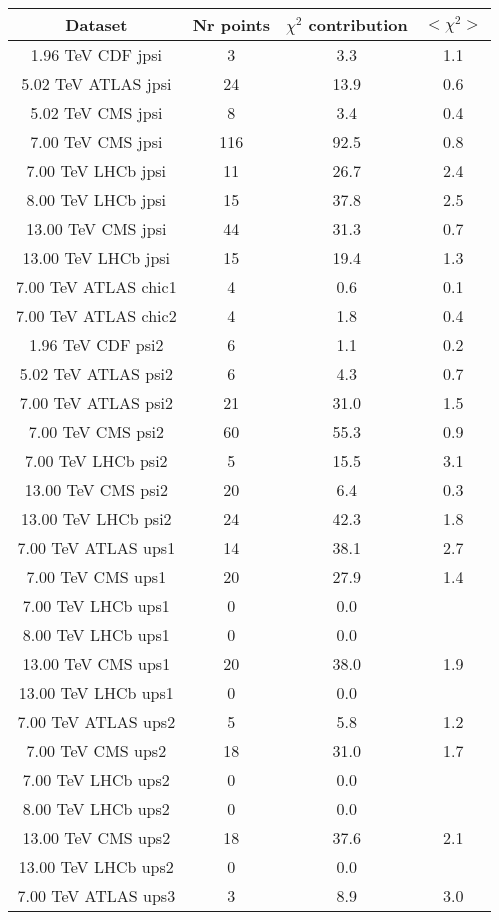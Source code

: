 \begin{table}[h!]
\centering
\begin{tabular}{c|c|c|c}
Dataset & Nr points & $\chi^2$ contribution & $<\chi^2>$ \\
\hline
1.96 TeV CDF jpsi & 3 & 3.3 & 1.1 \\
5.02 TeV ATLAS jpsi & 24 & 13.9 & 0.6 \\
5.02 TeV CMS jpsi & 8 & 3.4 & 0.4 \\
7.00 TeV CMS jpsi & 116 & 92.5 & 0.8 \\
7.00 TeV LHCb jpsi & 11 & 26.7 & 2.4 \\
8.00 TeV LHCb jpsi & 15 & 37.8 & 2.5 \\
13.00 TeV CMS jpsi & 44 & 31.3 & 0.7 \\
13.00 TeV LHCb jpsi & 15 & 19.4 & 1.3 \\
7.00 TeV ATLAS chic1 & 4 & 0.6 & 0.1 \\
7.00 TeV ATLAS chic2 & 4 & 1.8 & 0.4 \\
1.96 TeV CDF psi2 & 6 & 1.1 & 0.2 \\
5.02 TeV ATLAS psi2 & 6 & 4.3 & 0.7 \\
7.00 TeV ATLAS psi2 & 21 & 31.0 & 1.5 \\
7.00 TeV CMS psi2 & 60 & 55.3 & 0.9 \\
7.00 TeV LHCb psi2 & 5 & 15.5 & 3.1 \\
13.00 TeV CMS psi2 & 20 & 6.4 & 0.3 \\
13.00 TeV LHCb psi2 & 24 & 42.3 & 1.8 \\
7.00 TeV ATLAS ups1 & 14 & 38.1 & 2.7 \\
7.00 TeV CMS ups1 & 20 & 27.9 & 1.4 \\
7.00 TeV LHCb ups1 & 0 & 0.0 &  \\
8.00 TeV LHCb ups1 & 0 & 0.0 &  \\
13.00 TeV CMS ups1 & 20 & 38.0 & 1.9 \\
13.00 TeV LHCb ups1 & 0 & 0.0 &  \\
7.00 TeV ATLAS ups2 & 5 & 5.8 & 1.2 \\
7.00 TeV CMS ups2 & 18 & 31.0 & 1.7 \\
7.00 TeV LHCb ups2 & 0 & 0.0 &  \\
8.00 TeV LHCb ups2 & 0 & 0.0 &  \\
13.00 TeV CMS ups2 & 18 & 37.6 & 2.1 \\
13.00 TeV LHCb ups2 & 0 & 0.0 &  \\
7.00 TeV ATLAS ups3 & 3 & 8.9 & 3.0 \\

\end{tabular}
\end{table}
